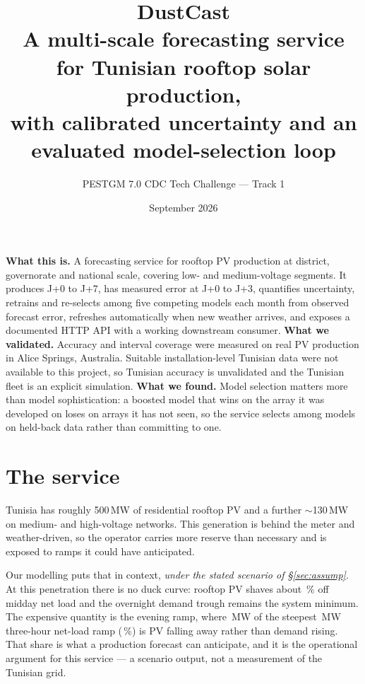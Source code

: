\documentclass[11pt,a4paper]{article}
\title{\vspace{-1.5cm}\textbf{DustCast}\\[0.2em]
\large A multi-scale forecasting service for Tunisian rooftop solar production,\\
with calibrated uncertainty and an evaluated model-selection loop}
\author{PESTGM 7.0 CDC Tech Challenge --- Track 1}
\date{September 2026}
\newcommand{\unit}[1]{\,\textsf{\small #1}}
\newcommand{\keybox}[1]{%
  \par\vspace{0.35em}\noindent\colorbox{callout}{%
  \begin{minipage}{\dimexpr\linewidth-2\fboxsep}\small #1\end{minipage}}\vspace{0.35em}\par}
\begin{document}
\maketitle
\vspace{-0.9cm}

\keybox{\textbf{What this is.} A forecasting service for rooftop PV production
at district, governorate and national scale, covering low- and medium-voltage
segments. It produces J+0 to J+7, has measured error at J+0 to J+3, quantifies
uncertainty, retrains and re-selects among five competing models each month from
observed forecast error, refreshes automatically when new weather arrives, and
exposes a documented HTTP API with a working downstream consumer.
\textbf{What we validated.} Accuracy and interval coverage were measured on real
PV production in Alice Springs, Australia. Suitable installation-level Tunisian
data were not available to this project, so Tunisian accuracy is unvalidated and
the Tunisian fleet is an explicit simulation. \textbf{What we found.} Model
selection matters more than model sophistication: a boosted model that wins on
the array it was developed on loses on arrays it has not seen, so the service
selects among models on held-back data rather than committing to one.}

\section{The service}

Tunisia has roughly 500\unit{MW} of residential rooftop PV and a further
$\sim$130\unit{MW} on medium- and high-voltage networks. This generation is
behind the meter and weather-driven, so the operator carries more reserve than
necessary and is exposed to ramps it could have anticipated.

Our modelling puts that in context, \emph{under the stated scenario of
\S\ref{sec:assump}}. At this penetration there is no duck curve: rooftop PV
shaves about \MiddayShavePct\,\% off midday net load and the overnight demand
trough remains the system minimum. The expensive quantity is the evening ramp,
where \RampPVMW\unit{MW} of the steepest \RampMW\unit{MW} three-hour net-load
ramp (\RampPVPct\,\%) is PV falling away rather than demand rising. That share is
what a production forecast can anticipate, and it is the operational argument for
this service --- a scenario output, not a measurement of the Tunisian grid.
\end{document}
